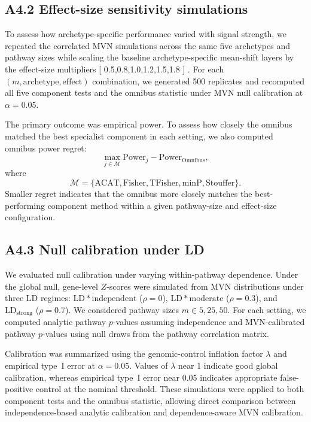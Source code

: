 \documentclass[unnumsec,webpdf,contemporary,large]{oup-authoring-template}%
\theoremstyle{thmstyleone}%
\theoremstyle{thmstyletwo}%
\theoremstyle{thmstylethree}%
\begin{document}
\begin{appendices}
\subsection{A4.2 Effect-size sensitivity simulations}

To assess how archetype-specific performance varied with signal strength, we repeated the correlated MVN simulations across the same five archetypes and pathway sizes while scaling the baseline archetype-specific mean-shift layers by the effect-size multipliers
[
{0.5,0.8,1.0,1.2,1.5,1.8}
]
. For each $(m,\mathrm{archetype},\mathrm{effect})$ combination, we generated 500 replicates and recomputed all five component tests and the omnibus statistic under MVN null calibration at $\alpha=0.05$.

The primary outcome was empirical power. To assess how closely the omnibus matched the best specialist component in each setting, we also computed omnibus power regret:
\[
\max_{j \in \mathcal{M}} \mathrm{Power}_j - \mathrm{Power}_{\mathrm{Omnibus}},
\]
where
\[
\mathcal{M}
=
\{\mathrm{ACAT}, \mathrm{Fisher}, \mathrm{TFisher}, \mathrm{minP}, \mathrm{Stouffer}\}.
\]
Smaller regret indicates that the omnibus more closely matches the best-performing component method within a given pathway-size and effect-size configuration.

\subsection{A4.3 Null calibration under LD}

We evaluated null calibration under varying within-pathway dependence. Under the global null, gene-level $Z$-scores were simulated from MVN distributions under three LD regimes: $\mathrm{LD}*{\mathrm{independent}}$ ($\rho=0$), $\mathrm{LD}*{\mathrm{moderate}}$ ($\rho=0.3$), and $\mathrm{LD}_{\mathrm{strong}}$ ($\rho=0.7$). We considered pathway sizes $m \in {5,25,50}$. For each setting, we computed analytic pathway $p$-values assuming independence and MVN-calibrated pathway $p$-values using null draws from the pathway correlation matrix.

Calibration was summarized using the genomic-control inflation factor $\lambda$ and empirical type~I error at $\alpha=0.05$. Values of $\lambda$ near 1 indicate good global calibration, whereas empirical type~I error near 0.05 indicates appropriate false-positive control at the nominal threshold. These simulations were applied to both component tests and the omnibus statistic, allowing direct comparison between independence-based analytic calibration and dependence-aware MVN calibration.


\end{appendices}
\end{document}
